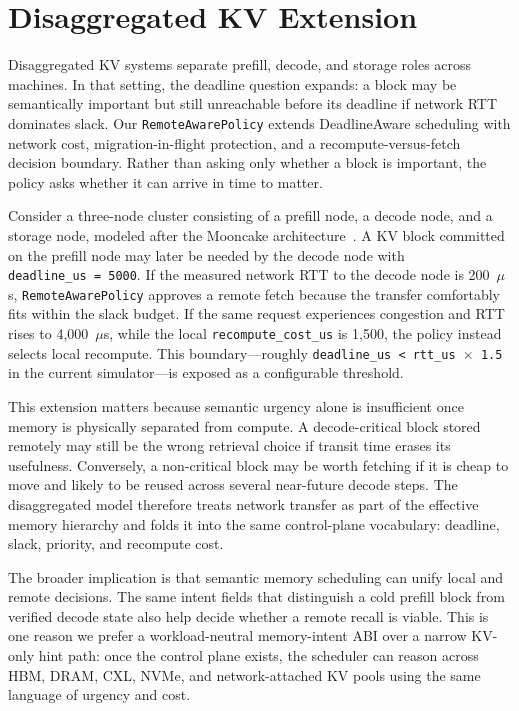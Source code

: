 \documentclass[10pt,twocolumn]{article}
\begin{document}
\section{Disaggregated KV Extension}
\label{sec:disagg}

Disaggregated KV systems separate prefill, decode, and storage roles across machines. In that setting, the deadline question expands: a block may be semantically important but still unreachable before its deadline if network RTT dominates slack. Our \texttt{RemoteAwarePolicy} extends DeadlineAware scheduling with network cost, migration-in-flight protection, and a recompute-versus-fetch decision boundary. Rather than asking only whether a block is important, the policy asks whether it can arrive in time to matter.

Consider a three-node cluster consisting of a prefill node, a decode node, and a storage node, modeled after the Mooncake architecture~\cite{mooncake}. A KV block committed on the prefill node may later be needed by the decode node with \texttt{deadline\_us~=~5000}. If the measured network RTT to the decode node is 200~$\mu$s, \texttt{RemoteAwarePolicy} approves a remote fetch because the transfer comfortably fits within the slack budget. If the same request experiences congestion and RTT rises to 4{,}000~$\mu$s, while the local \texttt{recompute\_cost\_us} is 1{,}500, the policy instead selects local recompute. This boundary---roughly \texttt{deadline\_us < rtt\_us $\times$ 1.5} in the current simulator---is exposed as a configurable threshold.

This extension matters because semantic urgency alone is insufficient once memory is physically separated from compute. A decode-critical block stored remotely may still be the wrong retrieval choice if transit time erases its usefulness. Conversely, a non-critical block may be worth fetching if it is cheap to move and likely to be reused across several near-future decode steps. The disaggregated model therefore treats network transfer as part of the effective memory hierarchy and folds it into the same control-plane vocabulary: deadline, slack, priority, and recompute cost.

The broader implication is that semantic memory scheduling can unify local and remote decisions. The same intent fields that distinguish a cold prefill block from verified decode state also help decide whether a remote recall is viable. This is one reason we prefer a workload-neutral memory-intent ABI over a narrow KV-only hint path: once the control plane exists, the scheduler can reason across HBM, DRAM, CXL, NVMe, and network-attached KV pools using the same language of urgency and cost.
\end{document}
